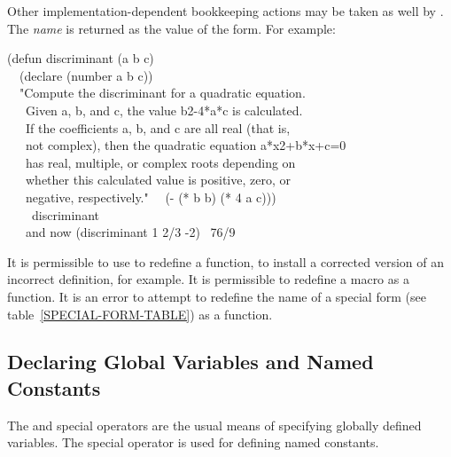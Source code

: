 \begin{defmac}
Other implementation-dependent bookkeeping actions may be taken as well
by .  The \emph{name} is returned as the value of the 
form.
For example:
\begin{lisp}
(defun discriminant (a b c) \\
~~(declare (number a b c)) \\
~~"Compute the discriminant for a quadratic equation. \\
~~~Given a, b, and c, the value b{\Xcircumflex}2-4*a*c is calculated. \\
~~~If the coefficients a, b, and c are all real (that is, \\
~~~not complex), then the quadratic equation a*x{\Xcircumflex}2+b*x+c=0 \\
~~~has real, multiple, or complex roots depending on \\
~~~whether this calculated value is positive, zero, or \\
~~~negative, respectively."
~~(- (* b b) (* 4 a c))) \\
~~~\EV\ discriminant \\
~~~\textrm{and now} (discriminant 1 2/3 -2) \EV\ 76/9
\end{lisp}

It is permissible to use  to redefine a function,
to install a corrected version of an incorrect definition, for example.
It is permissible to redefine a macro as a function.
It is an error to attempt to redefine the name of a special
form (see table~\ref{SPECIAL-FORM-TABLE}) as a function.
\end{defmac}

\subsection{Declaring Global Variables and Named Constants}

The  and  special operators are
the usual means of specifying globally defined variables.
The  special operator is used for defining named constants.

